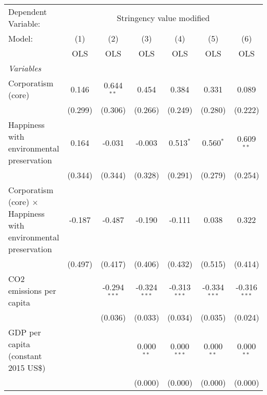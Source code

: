 
\begingroup
\centering
\begin{tabular}{lcccccc}
   \toprule
   Dependent Variable: & \multicolumn{6}{c}{Stringency value modified}\\
   Model:                                                                 & (1)     & (2)            & (3)            & (4)            & (5)            & (6)\\  
                                                                          &  OLS    & OLS            & OLS            & OLS            & OLS            & OLS\\  
   \midrule
   \emph{Variables}\\
   Corporatism (core)                                                     & 0.146   & 0.644$^{**}$   & 0.454          & 0.384          & 0.331          & 0.089\\   
                                                                          & (0.299) & (0.306)        & (0.266)        & (0.249)        & (0.280)        & (0.222)\\   
   Happiness with environmental preservation                              & 0.164   & -0.031         & -0.003         & 0.513$^{*}$    & 0.560$^{*}$    & 0.609$^{**}$\\   
                                                                          & (0.344) & (0.344)        & (0.328)        & (0.291)        & (0.279)        & (0.254)\\   
   Corporatism (core) $\times$ Happiness with environmental preservation  & -0.187  & -0.487         & -0.190         & -0.111         & 0.038          & 0.322\\   
                                                                          & (0.497) & (0.417)        & (0.406)        & (0.432)        & (0.515)        & (0.414)\\   
   CO2 emissions per capita                                               &         & -0.294$^{***}$ & -0.324$^{***}$ & -0.313$^{***}$ & -0.334$^{***}$ & -0.316$^{***}$\\   
                                                                          &         & (0.036)        & (0.033)        & (0.034)        & (0.035)        & (0.024)\\   
   GDP per capita (constant 2015 US\$)                                    &         &                & 0.000$^{**}$   & 0.000$^{***}$  & 0.000$^{**}$   & 0.000$^{**}$\\   
                                                                          &         &                & (0.000)        & (0.000)        & (0.000)        & (0.000)\\   

\end{tabular}
